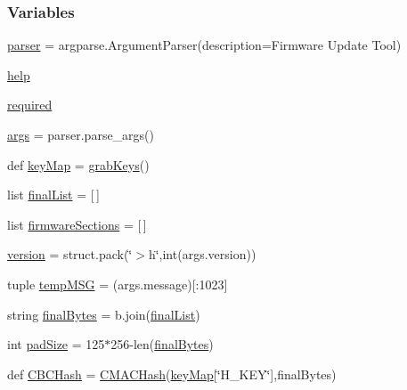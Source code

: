 \subsubsection*{Variables}
\begin{DoxyCompactItemize}
\item 
\hyperlink{namespacefw__protect_a90eee7a4677ca8b1ed116364a24367f9}{parser} = argparse.\+Argument\+Parser(description=\textquotesingle{}Firmware Update Tool\textquotesingle{})
\item 
\hyperlink{namespacefw__protect_a81ae9faedaa69e3e28e2960a0548df8d}{help}
\item 
\hyperlink{namespacefw__protect_ae81948490ddf54e80a22593640178350}{required}
\item 
\hyperlink{namespacefw__protect_a8187411843a6284ffb964ef3fb9fcab3}{args} = parser.\+parse\+\_\+args()
\item 
def \hyperlink{namespacefw__protect_a2b7d0c72182cc690371be6f920f0eba2}{key\+Map} = \hyperlink{namespacefw__protect_aa68fe4d7a127575d7e2402bbdb718a29}{grab\+Keys}()
\item 
list \hyperlink{namespacefw__protect_a27b60b34da7ce48640b2398f069b82d2}{final\+List} = \mbox{[}$\,$\mbox{]}
\item 
list \hyperlink{namespacefw__protect_a0a006b001f7ddd61e42904f9cb414647}{firmware\+Sections} = \mbox{[}$\,$\mbox{]}
\item 
\hyperlink{namespacefw__protect_a4c7a521b8f1a0769c09bfa4a1fca7dab}{version} = struct.\+pack(\char`\"{}$>$h\char`\"{},int(args.\+version))
\item 
tuple \hyperlink{namespacefw__protect_acc1e38a0dc7a0eb4f24d49e689e7b6cb}{temp\+M\+SG} = (args.\+message)\mbox{[}\+:1023\mbox{]}
\item 
string \hyperlink{namespacefw__protect_ab9b7930b3f30906e28d6e0294d700e07}{final\+Bytes} = b\textquotesingle{}\textquotesingle{}.join(\hyperlink{namespacefw__protect_a27b60b34da7ce48640b2398f069b82d2}{final\+List})
\item 
int \hyperlink{namespacefw__protect_a95940b25e7e22f9568e0596788510905}{pad\+Size} = 125$\ast$256-\/len(\hyperlink{namespacefw__protect_ab9b7930b3f30906e28d6e0294d700e07}{final\+Bytes})
\item 
def \hyperlink{namespacefw__protect_a4cbff5b07c2bcf804fb1261c803951a4}{C\+B\+C\+Hash} = \hyperlink{namespacefw__protect_a54f5aa6464f7083b24fed44f31279165}{C\+M\+A\+C\+Hash}(\hyperlink{namespacefw__protect_a2b7d0c72182cc690371be6f920f0eba2}{key\+Map}\mbox{[}\char`\"{}H\+\_\+\+K\+EY\char`\"{}\mbox{]},final\+Bytes)
\end{DoxyCompactItemize}


